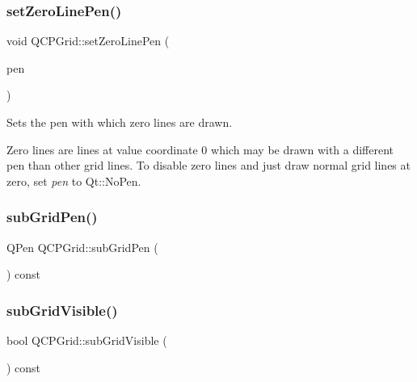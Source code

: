 \subsubsection{\texorpdfstring{setZeroLinePen()}{setZeroLinePen()}}
{\footnotesize\ttfamily void Q\+C\+P\+Grid\+::set\+Zero\+Line\+Pen (\begin{DoxyParamCaption}\item[{const Q\+Pen \&}]{pen }\end{DoxyParamCaption})}

Sets the pen with which zero lines are drawn.

Zero lines are lines at value coordinate 0 which may be drawn with a different pen than other grid lines. To disable zero lines and just draw normal grid lines at zero, set {\itshape pen} to Qt\+::\+No\+Pen. \mbox{\label{class_q_c_p_grid_ae231e5b87e68689a666f90531a15552f}} 
\subsubsection{\texorpdfstring{subGridPen()}{subGridPen()}}
{\footnotesize\ttfamily Q\+Pen Q\+C\+P\+Grid\+::sub\+Grid\+Pen (\begin{DoxyParamCaption}{ }\end{DoxyParamCaption}) const\hspace{0.3cm}{\ttfamily [inline]}}

\mbox{\label{class_q_c_p_grid_afface6d8cb6df3cbdc0b5c7c2658f96a}} 
\subsubsection{\texorpdfstring{subGridVisible()}{subGridVisible()}}
{\footnotesize\ttfamily bool Q\+C\+P\+Grid\+::sub\+Grid\+Visible (\begin{DoxyParamCaption}{ }\end{DoxyParamCaption}) const\hspace{0.3cm}{\ttfamily [inline]}}

\mbox{\label{class_q_c_p_grid_a85f248487110c4043be696aef5f2f6e1}} 
